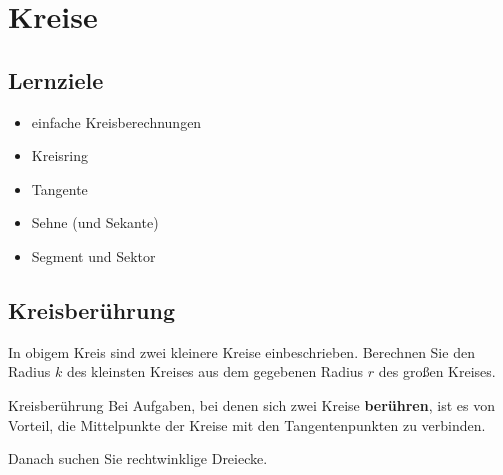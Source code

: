 
\section{Kreise}


\subsection*{Lernziele}

\begin{itemize}
\item einfache Kreisberechnungen
\item Kreisring
\item Tangente
\item Sehne (und Sekante)
\item Segment und Sektor
\end{itemize}


\newpage


\subsection{Kreisberührung}


In obigem Kreis sind zwei kleinere Kreise einbeschrieben. Berechnen
Sie den Radius $k$ des kleinsten Kreises aus dem gegebenen Radius $r$ des
großen Kreises.
\newpage


\begin{rezept}{Kreisberührung}{}
  Bei Aufgaben, bei denen sich zwei Kreise \textbf{berühren}, ist es
  von Vorteil, die Mittelpunkte der Kreise mit den Tangentenpunkten zu
  verbinden.

  Danach suchen Sie rechtwinklige Dreiecke.
\end{rezept}

